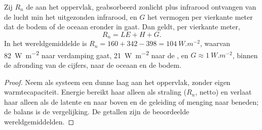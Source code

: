 \begin{proposition}\label{prop:b1:radiation-heat-transport:surface}
Zij $R_n$ de  aan het oppervlak, geabsorbeerd zonlicht plus infrarood ontvangen van de lucht min het uitgezonden infrarood, en $G$ het vermogen per vierkante meter dat de bodem of de oceaan eronder in gaat. Dan geldt, per vierkante meter,
\[
  R_n = LE + H + G .
\]
In het wereldgemiddelde is $R_n = 160 + 342 - 398 = \qty{104}{W.m^{-2}}$, waarvan \qty{82}{W.m^{-2}} naar verdamping gaat, \qty{21}{W.m^{-2}} naar de , en $G \approx \qty{1}{W.m^{-2}}$, binnen de afronding van de cijfers, naar de oceaan en de bodem.
\end{proposition}

\begin{proof}
Neem als systeem een dunne laag aan het oppervlak, zonder eigen warmtecapaciteit. Energie bereikt haar alleen als straling ($R_n$, netto) en verlaat haar alleen als de latente en  naar boven en de geleiding of menging naar beneden; de balans is de vergelijking. De getallen zijn de beoordeelde wereldgemiddelden.
\end{proof}

